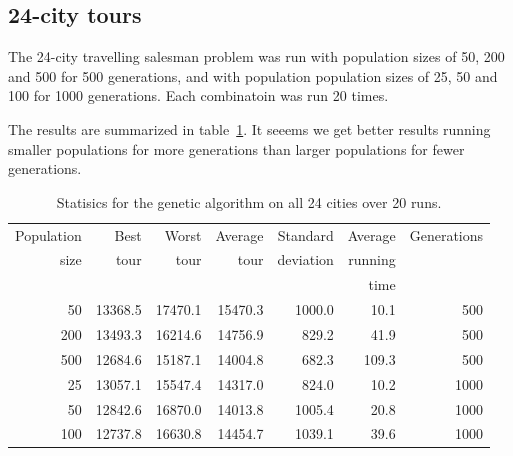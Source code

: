 \documentclass[a4paper]{article}
\begin{document}
\newpage

\subsection*{24-city tours}

The 24-city travelling salesman problem was run with population sizes of
50, 200 and 500 for 500 generations, and with population population sizes
of 25, 50 and 100 for 1000 generations. Each combinatoin was run 20 times.

The results are summarized in table~\ref{tab:ga24}. It seeems we get better
results running smaller populations for more generations than larger
populations for fewer generations.

\begin{table}[h]
  \centering
  \begin{tabular}{rrrrrrr}
    Population & Best & Worst & Average &
    Standard & Average & Generations \\
    size & tour & tour & tour & deviation & running & \\
    & & & & & time & \\
    \hline
    50 & 13368.5 & 17470.1 & 15470.3 & 1000.0 & 10.1 & 500 \\
    200 & 13493.3 & 16214.6 & 14756.9 & 829.2 & 41.9 & 500 \\
    500 & 12684.6 & 15187.1 & 14004.8 & 682.3 & 109.3 & 500 \\
    25 & 13057.1 & 15547.4 & 14317.0 & 824.0 & 10.2 & 1000 \\
    50 & 12842.6 & 16870.0 & 14013.8 & 1005.4 & 20.8 & 1000 \\
    100 & 12737.8 & 16630.8 & 14454.7 & 1039.1 & 39.6 & 1000 \\
  \end{tabular}
  \caption{Statisics for the genetic algorithm on
    all 24 cities over 20 runs.}
  \label{tab:ga24}
\end{table}
\end{document}
